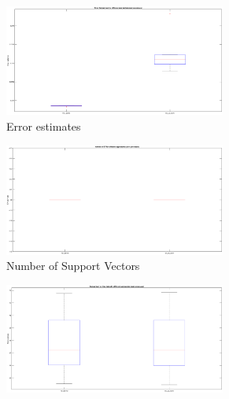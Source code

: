 \begin{figure}[!htpb]
	\begin{subfigure}[b]{0.34\textwidth}
		\centering
		\includegraphics[height= 0.65\textwidth, width = 0.8\textwidth]{Exercise3/Report/cali_1}
		\caption{Error estimates }\label{fig:cali_1}
	\end{subfigure}%
	\begin{subfigure}[b]{0.34\textwidth}
		\centering
		\includegraphics[height= 0.65\textwidth, width = 0.8\textwidth]{Exercise3/Report/cali_2}
		\caption{Number of Support Vectors}\label{fig:cali_2}
	\end{subfigure}%
	\begin{subfigure}[b]{0.34\textwidth}
		\centering
		\includegraphics[height= 0.65\textwidth, width = 0.8\textwidth]{Exercise3/Report/cali_3}

\end{subfigure}
\end{figure}
